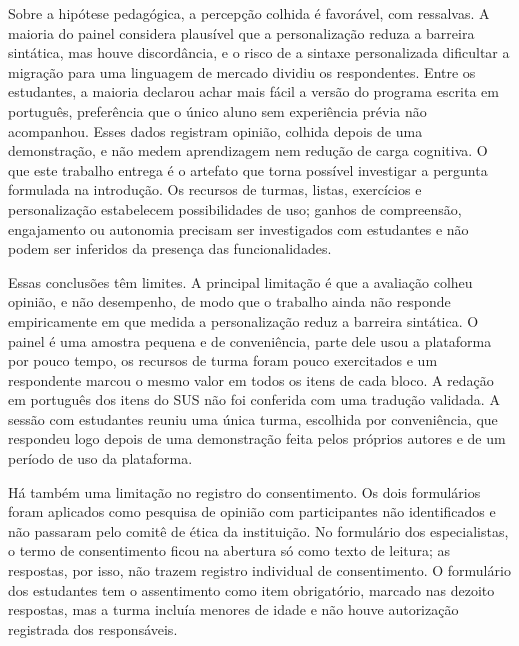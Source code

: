 Sobre a hipótese pedagógica, a percepção colhida é favorável, com ressalvas. A maioria do painel considera plausível que a personalização reduza a barreira sintática, mas houve discordância, e o risco de a sintaxe personalizada dificultar a migração para uma linguagem de mercado dividiu os respondentes. Entre os estudantes, a maioria declarou achar mais fácil a versão do programa escrita em português, preferência que o único aluno sem experiência prévia não acompanhou. Esses dados registram opinião, colhida depois de uma demonstração, e não medem aprendizagem nem redução de carga cognitiva. O que este trabalho entrega é o artefato que torna possível investigar a pergunta formulada na introdução. Os recursos de turmas, listas, exercícios e personalização estabelecem possibilidades de uso; ganhos de compreensão, engajamento ou autonomia precisam ser investigados com estudantes e não podem ser inferidos da presença das funcionalidades.

Essas conclusões têm limites. A principal limitação é que a avaliação colheu opinião, e não desempenho, de modo que o trabalho ainda não responde empiricamente em que medida a personalização reduz a barreira sintática. O painel é uma amostra pequena e de conveniência, parte dele usou a plataforma por pouco tempo, os recursos de turma foram pouco exercitados e um respondente marcou o mesmo valor em todos os itens de cada bloco. A redação em português dos itens do SUS não foi conferida com uma tradução validada. A sessão com estudantes reuniu uma única turma, escolhida por conveniência, que respondeu logo depois de uma demonstração feita pelos próprios autores e de um período de uso da plataforma.

Há também uma limitação no registro do consentimento. Os dois formulários foram aplicados como pesquisa de opinião com participantes não identificados e não passaram pelo comitê de ética da instituição. No formulário dos especialistas, o termo de consentimento ficou na abertura só como texto de leitura; as respostas, por isso, não trazem registro individual de consentimento. O formulário dos estudantes tem o assentimento como item obrigatório, marcado nas dezoito respostas, mas a turma incluía menores de idade e não houve autorização registrada dos responsáveis.

